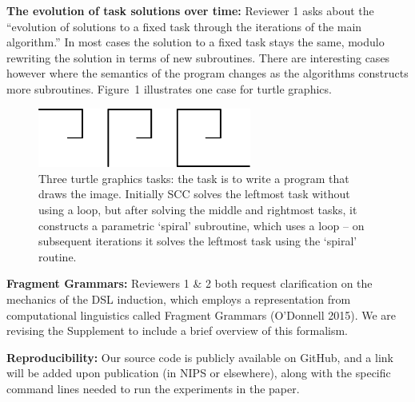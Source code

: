 \documentclass{article}
\begin{document}

\textbf{The evolution of task solutions over time:} %
Reviewer 1 asks about the ``evolution of solutions to a fixed task through the iterations of the main algorithm.''
In most cases the solution to a fixed task
stays the same,
modulo rewriting the solution in terms of new subroutines.
There are interesting cases however where the
semantics of the program changes as the algorithms constructs more subroutines. Figure~1
illustrates one case for turtle graphics.
\begin{figure}
  \centering
  \includegraphics[width=7cm]{figures/rebutal/spirals.eps}
  \caption{Three turtle graphics tasks: the task is to write a program that draws the image. Initially SCC solves the leftmost task without using a loop, but after solving the middle and rightmost tasks,
  it constructs a parametric `spiral' subroutine, which uses a loop -- on subsequent iterations it solves the leftmost task using the `spiral' routine.}
\end{figure}

\textbf{Fragment Grammars:} Reviewers 1 \& 2 both request clarification on the mechanics of the DSL induction,
which employs a representation from computational linguistics called Fragment Grammars (O'Donnell 2015).
We are revising the Supplement to include a brief overview of this formalism.

\textbf{Reproducibility:} %
Our source code is publicly available on GitHub,
and a link will be added upon publication (in NIPS or elsewhere),
along with the specific command lines  needed to run
the experiments in the paper.
\end{document}
